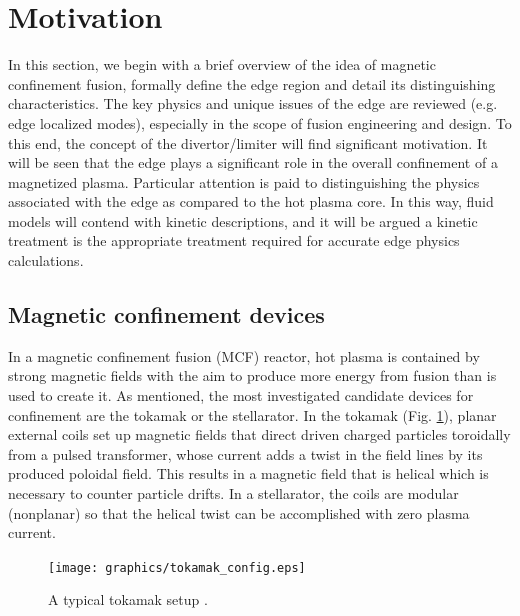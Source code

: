 \documentclass[11pt,titlepage]{report}
\begin{document}
\newpage

\section{Motivation}\label{sec:Motivation}

\indent \indent In this section, we begin with a brief overview of the idea of magnetic confinement fusion, formally define the edge region and detail its distinguishing characteristics. The key physics and unique issues of the edge are reviewed (e.g. edge localized modes), especially in the scope of fusion engineering and design. To this end, the concept of the divertor/limiter will find significant motivation. It will be seen that the edge plays a significant role in the overall confinement of a magnetized plasma. Particular attention is paid to distinguishing the physics associated with the edge as compared to the hot plasma core. In this way, fluid models will contend with kinetic descriptions, and it will be argued a kinetic treatment is the appropriate treatment required for accurate edge physics calculations.


\subsection{Magnetic confinement devices}\label{subsec:Magnetic_confinement_devices}

\indent \indent In a magnetic confinement fusion (MCF) reactor, hot plasma is contained by strong magnetic fields with the aim to produce more energy from fusion than is used to create it. As mentioned, the most investigated candidate devices for confinement are the tokamak or the stellarator. In the tokamak (Fig. \ref{fig:tokamak_config}), planar external coils set up magnetic fields that direct driven charged particles toroidally from a pulsed transformer, whose current adds a twist in the field lines by its produced poloidal field. This results in a magnetic field that is helical which is necessary to counter particle drifts. In a stellarator, the coils are modular (nonplanar) so that the helical twist can be accomplished with zero plasma current.

\begin{figure}[h!]
  \centering
    \texttt{[image: graphics/tokamak\_config.eps]}
  \caption{A typical tokamak setup \cite{EUROfusion}.}
  \label{fig:tokamak_config}
\end{figure}
\end{document}
